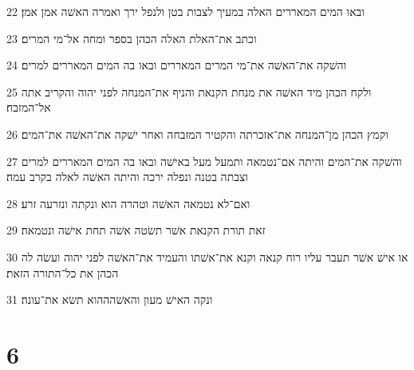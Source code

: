 \par 22 ובאו המים המאררים האלה במעיך לצבות בטן ולנפל ירך ואמרה האשׁה אמן אמן׃
\par 23 וכתב את־האלת האלה הכהן בספר ומחה אל־מי המרים׃
\par 24 והשׁקה את־האשׁה את־מי המרים המאררים ובאו בה המים המאררים למרים׃
\par 25 ולקח הכהן מיד האשׁה את מנחת הקנאת והניף את־המנחה לפני יהוה והקריב אתה אל־המזבח׃
\par 26 וקמץ הכהן מן־המנחה את־אזכרתה והקטיר המזבחה ואחר ישׁקה את־האשׁה את־המים׃
\par 27 והשׁקה את־המים והיתה אם־נטמאה ותמעל מעל באישׁה ובאו בה המים המאררים למרים וצבתה בטנה ונפלה ירכה והיתה האשׁה לאלה בקרב עמה׃
\par 28 ואם־לא נטמאה האשׁה וטהרה הוא ונקתה ונזרעה זרע׃
\par 29 זאת תורת הקנאת אשׁר תשׂטה אשׁה תחת אישׁה ונטמאה׃
\par 30 או אישׁ אשׁר תעבר עליו רוח קנאה וקנא את־אשׁתו והעמיד את־האשׁה לפני יהוה ועשׂה לה הכהן את כל־התורה הזאת׃
\par 31 ונקה האישׁ מעון והאשׁהההוא תשׂא את־עונה׃

\chapter{6}

